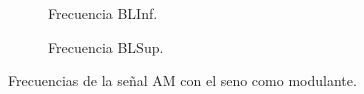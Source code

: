       \begin{figure}[H]
        \centering
        \begin{subfigure}[H]{0.48\textwidth}
          \caption{Frecuencia BLInf.}
          \label{fig:FreqBLInfAMSeno}
        \end{subfigure}
        \hfill 
        \begin{subfigure}[H]{0.48\textwidth}
          \caption{Frecuencia BLSup.}
          \label{fig:FreqBLSupAMSeno}
        \end{subfigure}
      
        \caption{Frecuencias de la señal AM con el seno como modulante.}
        \label{fig:FreqAMSeno}
      \end{figure}

